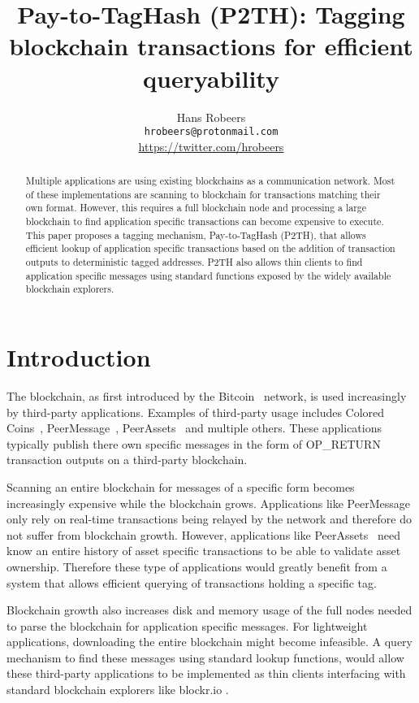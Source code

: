\documentclass[a4paper,10pt]{article}
\title{Pay-to-TagHash (P2TH): Tagging blockchain transactions for efficient queryability}
\author{Hans Robeers\\ \texttt{hrobeers@protonmail.com}\\ \url{https://twitter.com/hrobeers}}
\begin{document}
\maketitle

\begin{abstract}
Multiple applications are using existing blockchains as a communication network.
Most of these implementations are scanning to blockchain for transactions matching their own format.
However, this requires a full blockchain node and processing a large blockchain to find application specific transactions can become expensive to execute.
This paper proposes a tagging mechanism, Pay-to-TagHash (P2TH), that allows efficient lookup of application specific transactions based on the addition of transaction outputs to deterministic tagged addresses. P2TH also allows thin clients to find application specific messages using standard functions exposed by the widely available blockchain explorers.
\end{abstract}

\doclicenseThis

\section{Introduction}
The blockchain, as first introduced by the Bitcoin~\cite{Nak08} network, is used increasingly by third-party applications.
Examples of third-party usage includes Colored Coins~\cite{Ros12}, PeerMessage~\cite{Emeth}, PeerAssets~\cite{Pchem} and multiple others.
These applications typically publish there own specific messages in the form of OP\_RETURN transaction outputs on a third-party blockchain.

Scanning an entire blockchain for messages of a specific form becomes increasingly expensive while the blockchain grows.
Applications like PeerMessage~\cite{Emeth} only rely on real-time transactions being relayed by the network and therefore do not suffer from blockchain growth.
However, applications like PeerAssets~\cite{Pchem} need know an entire history of asset specific transactions to be able to validate asset ownership.
Therefore these type of applications would greatly benefit from a system that allows efficient querying of transactions holding a specific tag.

Blockchain growth also increases disk and memory usage of the full nodes needed to parse the blockchain for application specific messages. For lightweight applications, downloading the entire blockchain might become infeasible. A query mechanism to find these messages using standard lookup functions, would allow these third-party applications to be implemented as thin clients interfacing with standard blockchain explorers like blockr.io \cite{Blockr}.
\end{document}
